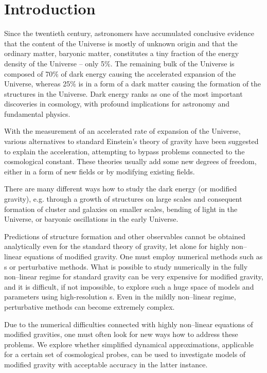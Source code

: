 \chapter*{Introduction}
Since the twentieth century, astronomers have accumulated conclusive evidence that the content of the Universe is mostly of unknown origin and that the ordinary matter, baryonic matter, constitutes a tiny fraction of the energy density of the Universe -- only 5\%. The remaining bulk of the Universe is composed of 70\% of dark energy causing the accelerated expansion of the Universe, whereas 25\% is in a form of a dark matter causing the formation of the structures in the Universe. Dark energy ranks as one of the most important discoveries in cosmology, with profound implications for astronomy and fundamental physics.

With the measurement of an accelerated rate of expansion of the Universe, various alternatives to standard Einstein's theory of gravity have been suggested to explain the acceleration, attempting to bypass problems connected to the cosmological constant. These theories usually add some new degrees of freedom, either in a form of new fields or by modifying existing fields.

There are many different ways how to study the dark energy (or modified gravity), e.g. through a growth of structures on large scales and consequent formation of cluster and galaxies on smaller scales, bending of light in the Universe, or baryonic oscillations in the early Universe.

Predictions of structure formation and other observables cannot be obtained analytically even for the standard theory of gravity, let alone for highly non--linear equations of modified gravity. One must employ numerical methods such as \nbodysim s or perturbative methods. What is possible to study numerically in the fully non--linear regime for standard gravity can be very expensive for modified gravity, and it is difficult, if not impossible, to explore such a huge space of models and parameters using high-resolution \nbodysim s. Even in the mildly non--linear regime, perturbative methods can become extremely complex.

Due to the numerical difficulties connected with highly non--linear equations of modified gravities, one must often look for new ways how to address these problems. We explore whether simplified dynamical approximations, applicable for a certain set of cosmological probes, can be used to investigate models of modified gravity with acceptable accuracy in the latter instance.

